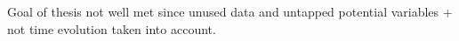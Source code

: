Goal of thesis not well met since unused data and untapped potential variables + not time evolution taken into account.